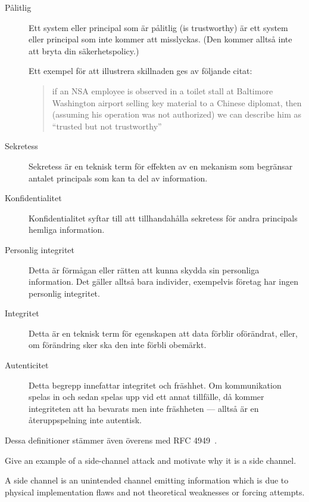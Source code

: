 \documentclass[svv,addpoints]{miunexam}
\begin{document}
\begin{questions}
\begin{solution}
\begin{description}
      \item[Pålitlig] Ett system eller principal som är pålitlig 
        (\foreignlanguage{english}{is trustworthy}) är ett system eller 
        principal som inte kommer att misslyckas.
        (Den kommer alltså inte att bryta din säkerhetspolicy.)

        Ett exempel för att illustrera skillnaden ges av följande citat: 
        \blockcquote[s.\ 13]{Anderson2008sea}{%
          if an NSA employee is observed in a toilet stall at Baltimore 
          Washington airport selling key material to a Chinese diplomat, then 
          (assuming his operation was not authorized) we can describe him as 
          \enquote{trusted but not trustworthy}%
        }.

      \item[Sekretess] Sekretess är en teknisk term för effekten av en mekanism 
        som begränsar antalet principals som kan ta del av information.

      \item[Konfidentialitet] Konfidentialitet syftar till att tillhandahålla 
        sekretess för andra principals hemliga information.

      \item[Personlig integritet] Detta är förmågan eller rätten att kunna 
        skydda sin personliga information.
        Det gäller alltså bara individer, exempelvis företag har ingen 
        personlig integritet.

      \item[Integritet] Detta är en teknisk term för egenskapen att data 
        förblir oförändrat, eller, om förändring sker ska den inte förbli 
        obemärkt.

      \item[Autenticitet] Detta begrepp innefattar integritet och fräshhet.
        Om kommunikation spelas in och sedan spelas upp vid ett annat 
        tillfälle, då kommer integriteten att ha bevarats men inte fräshheten 
        --- alltså är en återuppspelning inte autentisk.
    \end{description}
    Dessa definitioner stämmer även överens med RFC 4949~\cite{rfc4949}.
  \end{solution}


  
\question[4]\label{q:sidechannels}
Give an example of a side-channel attack and motivate why it is a side channel.

\begin{solution}
  A side channel is an unintended channel emitting information which is due 
  to physical implementation flaws and not theoretical weaknesses or forcing 
  attempts.


\end{solution}
\end{questions}
\end{document}
